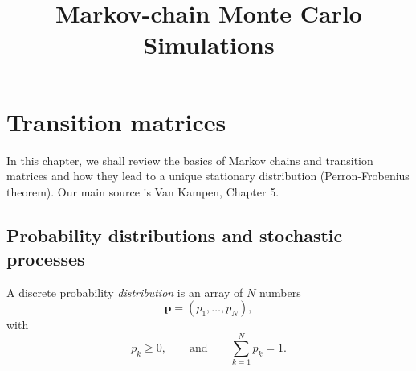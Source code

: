 \documentclass{report}
\begin{document}
\newcommand{\vct}[1]{\mathbf{#1}}
\newcommand{\vx}{\vct{x}}
\newcommand{\vy}{\vct{y}}
\newcommand{\Z}{\mathcal{Z}}
\newcommand{\E}{\mathcal{E}}
\newcommand{\Ham}{\mathcal{H}}
\newcommand{\W}{\mathcal{W}}
\newcommand{\A}{\mathcal{A}}
\newcommand{\LL}{\mathcal{L}}
\newcommand{\var}{\mathrm{var}}
\newcommand{\com}{\mathrm{com}}

\newcommand{\llbra}{[\![}
\newcommand{\llket}{]\!]}

\newcommand{\repl}[2]{{\color{gray} [#1] }{\color{blue} #2}}
\newcommand{\add}[1]{{\color{blue} #1}}
\newcommand{\del}[1]{{\color{gray} [#1]}}
\newcommand{\note}[1]{{\color{OliveGreen}\small [\textbf{Comment.} #1]}}





\title{Markov-chain Monte Carlo Simulations}
\author{ \vspace{-10ex} }
\date{ \vspace{-10ex} }


\maketitle





\chapter{Transition matrices}



In this chapter, we shall review the basics of
Markov chains and transition matrices
and how they lead to a unique stationary distribution
(Perron-Frobenius theorem).
%
Our main source is Van Kampen\cite{vankampen},
Chapter 5.


\section{Probability distributions
and stochastic processes}



A discrete probability \emph{distribution}
is an array of $N$ numbers
\begin{equation}
  \mathbf p
  =
  (p_1, \dots, p_N),
\end{equation}
with
\begin{equation}
  p_k \ge 0,
  \qquad
  \mathrm{and}
  \qquad
  \sum_{ k = 1 }^N p_k = 1.
\label{eq:probreq}
\end{equation}
\end{document}

